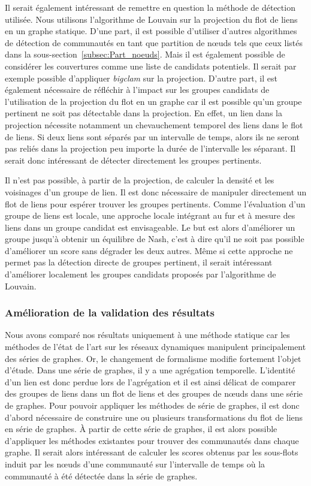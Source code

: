 Il serait également intéressant de remettre en question la méthode de détection utilisée.
Nous utilisons l'algorithme de Louvain sur la projection du flot de liens en un graphe statique.
D'une part, il est possible d'utiliser d'autres algorithmes de détection de communautés en tant que partition de n\oe{}uds tels que ceux listés dans la sous-section~\ref{subsec:Part_noeuds}.
Mais il est également possible de considérer les couvertures comme une liste de candidats potentiels.
Il serait par exemple possible d'appliquer \emph{bigclam} sur la projection.
D'autre part, il est également nécessaire de réfléchir à l'impact sur les groupes candidats de l'utilisation de la projection du flot en un graphe car il est possible qu'un groupe pertinent ne soit pas détectable dans la projection.
En effet, un lien dans la projection nécessite notamment un chevauchement temporel des liens dans le flot de liens.
Si deux liens sont séparés par un intervalle de temps, alors ils ne seront pas reliés dans la projection peu importe la durée de l'intervalle les séparant.
Il serait donc intéressant de détecter directement les groupes pertinents.

Il n'est pas possible, à partir de la projection, de calculer la densité et les voisinages d'un groupe de lien.
Il est donc nécessaire de manipuler directement un flot de liens pour espérer trouver les groupes pertinents.
Comme l'évaluation d'un groupe de liens est locale, une approche locale intégrant au fur et à mesure des liens dans un groupe candidat est envisageable.
Le but est alors d'améliorer un groupe jusqu'à obtenir un équilibre de Nash, c'est à dire qu'il ne soit pas possible d'améliorer un score sans dégrader les deux autres.
Même si cette approche ne permet pas la détection directe de groupes pertinent, il serait intéressant d'améliorer localement les groupes candidats proposés par l'algorithme de Louvain.


\subsubsection{Amélioration de la validation des résultats}

Nous avons comparé nos résultats uniquement à une méthode statique car les méthodes de l'état de l'art sur les réseaux dynamiques manipulent principalement des séries de graphes.
Or, le changement de formalisme modifie fortement l'objet d'étude.
Dans une série de graphes, il y a une agrégation temporelle.
L'identité d'un lien est donc perdue lors de l'agrégation et il est ainsi délicat de comparer des groupes de liens dans un flot de liens et des groupes de n\oe{}uds dans une série de graphes.
Pour pouvoir appliquer les méthodes de série de graphes, il est donc d'abord nécessaire de construire une ou plusieurs transformations du flot de liens en série de graphes.
\`A partir de cette série de graphes, il est alors possible d'appliquer les méthodes existantes pour trouver des communautés dans chaque graphe.
Il serait alors intéressant de calculer les scores obtenus par les sous-flots induit par les n\oe{}uds d'une communauté sur l'intervalle de temps où la communauté à été détectée dans la série de graphes.


